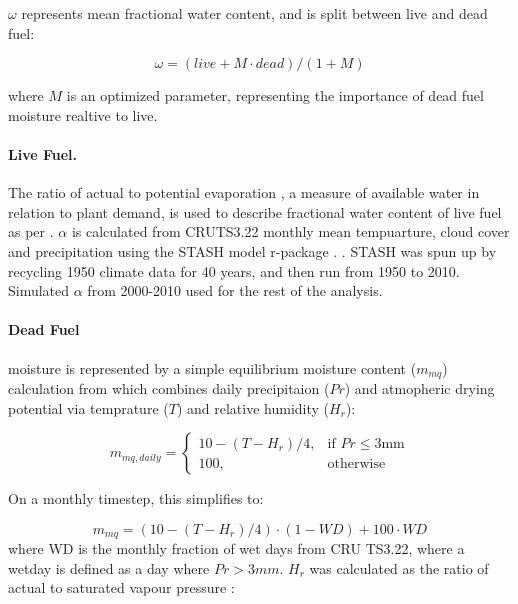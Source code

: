 $\omega$ represents mean fractional water content, and is split between live and dead fuel:

\begin{equation}
    \omega = (live + M \cdot dead) / (1 + M)
\end{equation}

where $M$ is an optimized parameter, representing the importance of dead fuel moisture realtive to live.

\paragraph{Live Fuel.}
The ratio of actual to potential evaporation \citep[$\alpha$][]{prentice1993simulation}, a measure of available water in relation to plant demand, is used to describe fractional water content of live fuel as per \citet{harrison2010fire, bistinas2014causal}.
$\alpha$ is calculated from CRUTS3.22 monthly mean tempuarture, cloud cover and precipitation using the STASH model \citep{sykes1996bioclimatic} r-package \citep{rstash}. . STASH was spun up by recycling 1950 climate data for 40 years, and then run from 1950 to 2010. Simulated $\alpha$ from 2000-2010 used for the rest of the analysis.

\paragraph{Dead Fuel} moisture is represented by a simple equilibrium moisture content ($m_{mq}$) calculation from \citep{viney1991review} which combines daily precipitaion ($Pr$) and atmopheric drying potential via temprature ($T$) and relative humidity ($H_r$):

\begin{equation}
     m_{mq, daily}=
        \begin{cases}
            10 - (T - H_r) / 4 ,& \text{if } Pr\leq 3 \text{mm}\\
            100,              & \text{otherwise}
        \end{cases}
\end{equation}

On a monthly timestep, this simplifies to:

\begin{equation}
     m_{mq}=
        (10 - (T - H_r) / 4) \cdot (1 - WD)
        + 100 \cdot WD
\end{equation}
where WD is the monthly fraction of wet days from CRU TS3.22, where a wetday is defined as a day where $Pr > 3mm$. $H_r$ was calculated as the ratio of actual to saturated vapour pressure :

